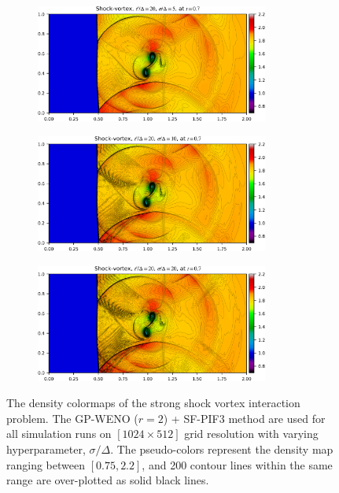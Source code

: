 \begin{figure}
    \centering
    \begin{subfigure}{\textwidth}
        \centering
        \includegraphics[width=0.84\textwidth]{fig/shockvortex_gp_ed20_sd5.png}
    \end{subfigure}
    \par\medskip
    \begin{subfigure}{\textwidth}
        \centering
        \includegraphics[width=0.84\textwidth]{fig/shockvortex_gp_ed20_sd10.png}
    \end{subfigure}
    \par\medskip
    \begin{subfigure}{\textwidth}
        \centering
        \includegraphics[width=0.84\textwidth]{fig/shockvortex_gp_ed20_sd20.png}
    \end{subfigure}
    \caption{The density colormaps of the strong shock vortex interaction problem.
        The GP-WENO (\( r = 2 \)) + SF-PIF3 method
        are used for all simulation runs
        on \( [1024 \times 512] \) grid resolution
        with varying hyperparameter, \( \sigma/\Delta \).
        The pseudo-colors represent the density map ranging between \( [0.75, 2.2] \),
        and 200 contour lines within the same range are over-plotted as solid black lines.
    }\label{fig:shockvortex}
\end{figure}


